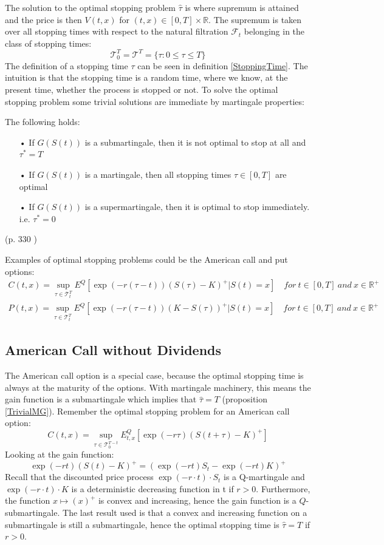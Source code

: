 The solution to the optimal stopping problem $\hat{\tau}$ is where supremum is attained and the price is then $V(t,x)$ for $(t,x)\in [0,T] \times \mathbb{R}$. The supremum is taken over all stopping times with respect to the natural filtration $\mathcal{F}_{t}$ belonging in the class of stopping times:
$$\mathcal{T}_0^T=\mathcal{T}^T=\{\tau : 0 \leq \tau \leq T \}$$
The definition of a stopping time $\tau$ can be seen in definition \ref{StoppingTime}. The intuition is that the stopping time is a random time, where we know, at the present time, whether the process is stopped or not. To solve the optimal stopping problem some trivial solutions are immediate by martingale properties:
\begin{proposition}\label{TrivialMG}
The following holds:
\begin{enumerate}
\item[•] If $G(S(t))$ is a submartingale, then it is not optimal to stop at all and $\tau^*=T$
\item[•] If $G(S(t))$ is a martingale, then all stopping times $\tau\in [0,T]$ are optimal
\item[•] If $G(S(t))$ is a supermartingale, then it is optimal to stop immediately. i.e. $\tau^*=0$
\end{enumerate}
\null \hfill(p. 330 \parencite{finKont})
\end{proposition}

Examples of optimal stopping problems could be the American call and put options:
\begin{align*}
C(t,x)=\sup_{\tau \in \mathcal{T}_t^T} E^Q[\exp(-r(\tau-t)) (S(\tau)-K)^+|S(t)=x] \quad for \ t\in [0,T] \ and \ x\in\mathbb{R}^+\\
P(t,x)=\sup_{\tau \in \mathcal{T}_t^T} E^Q[\exp(-r(\tau-t)) (K-S(\tau))^+|S(t)=x] \quad for \ t\in [0,T] \ and \ x\in\mathbb{R}^+
\end{align*}


\subsection{American Call without Dividends}\label{AmericanCall}
The American call option is a special case, because the optimal stopping time is always at the maturity of the options. With martingale machinery, this means the gain function is a submartingale which implies that $\hat{\tau}=T$ (proposition \ref{TrivialMG}). Remember the optimal stopping problem for an American call option:
$$C(t,x)=\sup_{\tau \in \mathcal{T}_0^{T-t}} E_{t,x}^Q[\exp(-r\tau) (S(t+\tau)-K)^+]$$
Looking at the gain function:
\begin{equation*}
\exp(-r t) (S(t)-K)^+ = (\exp(-r t) S_{t} - \exp(-r t) K)^+
\end{equation*}
Recall that the discounted price process $\exp(-r\cdot t) \cdot S_t$ is a Q-martingale and $\exp(-r\cdot t) \cdot K$ is a deterministic decreasing function in t if $r>0$. Furthermore, the function $x \mapsto (x)^+$ is convex and increasing, hence the gain function is a $Q$-submartingale. The last result used is that a convex and increasing function on a submartingale is still a submartingale, hence the optimal stopping time is $\hat{\tau}=T$ if $r>0$.

